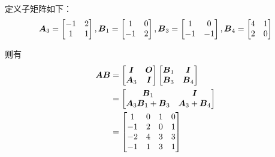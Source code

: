 \documentclass{ctexart}
\begin{document}
\begin{problem}\

定义子矩阵如下：
\begin{equation*}
    \boldsymbol{A}_3=
    \begin{bmatrix}
        -1 & 2 \\1&1
    \end{bmatrix},
    \boldsymbol{B}_1=
    \begin{bmatrix}
        1 & 0 \\-1&2
    \end{bmatrix},
    \boldsymbol{B}_3=
    \begin{bmatrix}
        1 & 0 \\-1&-1
    \end{bmatrix},
    \boldsymbol{B}_4=
    \begin{bmatrix}
        4 & 1 \\2&0
    \end{bmatrix}
\end{equation*}

则有
\begin{align*}
    \boldsymbol{A}\boldsymbol{B} & =
    \begin{bmatrix}
        \boldsymbol{I} & \boldsymbol{O} \\\boldsymbol{A}_3&\boldsymbol{I}
    \end{bmatrix}
    \begin{bmatrix}
        \boldsymbol{B}_1 & \boldsymbol{I} \\\boldsymbol{B}_3&\boldsymbol{B}_4
    \end{bmatrix}                        \\&=
    \begin{bmatrix}
        \boldsymbol{B}_1 & \boldsymbol{I} \\\boldsymbol{A}_3\boldsymbol{B}_1+\boldsymbol{B}_3&\boldsymbol{A}_3+\boldsymbol{B}_4
    \end{bmatrix} \\&=
    \begin{bmatrix}
        1  & 0 & 1 & 0 \\
        -1 & 2 & 0 & 1 \\
        -2 & 4 & 3 & 3 \\
        -1 & 1 & 3 & 1
    \end{bmatrix}
\end{align*}

\end{problem}
\end{document}
